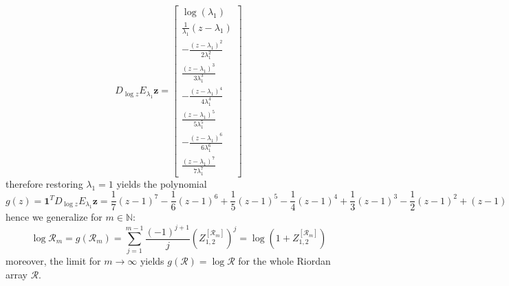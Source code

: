\begin{displaymath}
D_{\log{z}}E_{\lambda_{1}}\boldsymbol{z} = \left[\begin{matrix}\log{\left (\lambda_{1} \right )}\\\frac{1}{\lambda_{1}} \left(z - \lambda_{1}\right)\\- \frac{\left(z - \lambda_{1}\right)^{2}}{2 \lambda_{1}^{2}}\\\frac{\left(z - \lambda_{1}\right)^{3}}{3 \lambda_{1}^{3}}\\- \frac{\left(z - \lambda_{1}\right)^{4}}{4 \lambda_{1}^{4}}\\\frac{\left(z - \lambda_{1}\right)^{5}}{5 \lambda_{1}^{5}}\\- \frac{\left(z - \lambda_{1}\right)^{6}}{6 \lambda_{1}^{6}}\\\frac{\left(z - \lambda_{1}\right)^{7}}{7 \lambda_{1}^{7}}\end{matrix}\right]
\end{displaymath}
therefore restoring $\lambda_{1}=1$ yields the polynomial
\begin{displaymath}
g{\left (z \right )} = \boldsymbol{1}^{T}D_{\log{z}}E_{\lambda_{1}}\boldsymbol{z} = \frac{1}{7} \left(z - 1\right)^{7} - \frac{1}{6} \left(z - 1\right)^{6} + \frac{1}{5} \left(z - 1\right)^{5} - \frac{1}{4} \left(z - 1\right)^{4} + \frac{1}{3} \left(z - 1\right)^{3} - \frac{1}{2} \left(z - 1\right)^{2} + (z - 1)
\end{displaymath}
hence we generalize for $m\in\mathbb{N}$:
\begin{displaymath}
\log{\mathcal{R}_{m}} = g{\left (\mathcal{R}_{m} \right )} = \sum_{j=1}^{m-1}{\frac{(-1)^{j+1}}{j}{\left(Z_{1,2}^{[\mathcal{R}_{m}]}\right)^{j} }} = \log{\left(1 + Z_{1,2}^{[\mathcal{R}_{m}]}\right)}
\end{displaymath}
moreover, the limit for $m \rightarrow \infty$ yields $ g{\left (\mathcal{R} \right )} = \log{\mathcal{R}} $ for the whole Riordan array $\mathcal{R}$.

